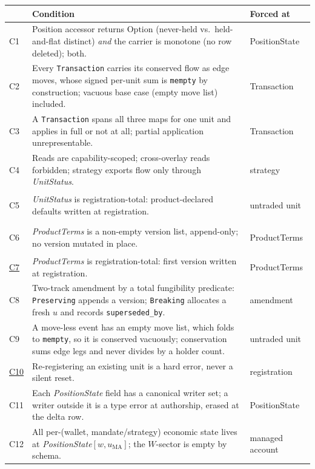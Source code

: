 \begin{longtable}{@{}p{0.8cm} p{11.0cm} p{2.5cm}@{}}
\toprule
 & \textbf{Condition} & \textbf{Forced at} \\
\midrule
\endhead
\hypertarget{cond:C1}{C1}\label{cond:C1} & Position accessor returns $\mathrm{Option}$
(never-held vs.\ held-and-flat distinct) \emph{and} the carrier is monotone (no row
deleted); both. & PositionState \\
\addlinespace
\hypertarget{cond:C2}{C2}\label{cond:C2} & Every \texttt{Transaction} carries its conserved
flow as edge moves, whose signed per-unit sum is \texttt{mempty} by construction; vacuous
base case (empty move list) included. & Transaction \\
\addlinespace
\hypertarget{cond:C3}{C3}\label{cond:C3} & A \texttt{Transaction} spans all three maps for
one unit and applies in full or not at all; partial application unrepresentable. &
Transaction \\
\addlinespace
\hypertarget{cond:C4}{C4}\label{cond:C4} & Reads are capability-scoped; cross-overlay reads
forbidden; strategy exports flow only through \emph{UnitStatus}. & strategy \\
\addlinespace
\hypertarget{cond:C5}{C5}\label{cond:C5} & \emph{UnitStatus} is registration-total:
product-declared defaults written at registration. & untraded unit \\
\addlinespace
\hypertarget{cond:C6}{C6}\label{cond:C6} & \emph{ProductTerms} is a non-empty version list,
append-only; no version mutated in place. & ProductTerms \\
\addlinespace
\hyperref[cond:C7]{C7} & \emph{ProductTerms} is registration-total: first
version written at registration. & ProductTerms \\
\addlinespace
\hypertarget{cond:C8}{C8}\label{cond:C8} & Two-track amendment by a total fungibility
predicate: \texttt{Preserving} appends a version; \texttt{Breaking} allocates a fresh $u$
and records \texttt{superseded\_by}. & amendment \\
\addlinespace
\hypertarget{cond:C9}{C9}\label{cond:C9} & A move-less event has an empty move list, which
folds to \texttt{mempty}, so it is conserved vacuously; conservation sums edge legs and never
divides by a holder count. & untraded unit \\
\addlinespace
\hyperref[cond:C10]{C10} & Re-registering an existing unit is a hard
error, never a silent reset. & registration \\
\addlinespace
\hypertarget{cond:C11}{C11}\label{cond:C11} & Each \emph{PositionState} field has a
canonical writer set; a writer outside it is a type error at authorship, erased at the
delta row. & PositionState \\
\addlinespace
\hypertarget{cond:C12}{C12}\label{cond:C12} & All per-(wallet, mandate/strategy) economic
state lives at \emph{PositionState}$[w,u_{\mathrm{MA}}]$; the $W$-sector is empty by
schema. & managed account \\
\bottomrule
\end{longtable}

